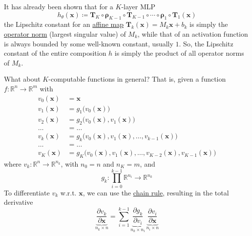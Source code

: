   \begin{theorem}
    \label{thm:lipschitz-upper-bound-for-mlps}
    It has already been shown that for a $K$-layer MLP
    \begin{equation}
      h_\theta (\mathbf{x}) \coloneqq \mathbf{T}_K \circ \boldsymbol{\rho}_{K-1} \circ \mathbf{T}_{K-1} \circ \cdots \circ \boldsymbol{\rho}_1 \circ \mathbf{T}_1 (\mathbf{x})
    \end{equation}
    the Lipschitz constant for an \hyperref[alg-def:affine-map]{affine map} $\mathbf{T}_k (\mathbf{x}) = M_k \mathbf{x} + b_k$ is simply the \hyperref[lin-def:operator-norm-2]{operator norm} (largest singular value) of $M_k$, while that of an activation function is always bounded by some well-known constant, usually $1$. So, the Lipschitz constant of the entire composition $h$ is simply the product of all operator norms of $M_k$. 
  \end{theorem}

  What about $K$-computable functions in general? That is, given a function $f: \mathbb{R}^n \to \mathbb{R}^m$ with 
  \begin{align}
    v_0 (\mathbf{x}) & = \mathbf{x} \\ 
    v_1 (\mathbf{x}) & = g_1 \big(v_0(\mathbf{x}) \big) \\
    v_2 (\mathbf{x}) & = g_2 \big(v_0(\mathbf{x}), v_1 (\mathbf{x}) \big) \\ 
    \ldots & = \ldots \\
    v_k (\mathbf{x}) & = g_k \big(v_0 (\mathbf{x}), v_1(\mathbf{x}), \ldots, v_{k-1} (\mathbf{x}) \big) \\
    \ldots & = \ldots \\
    v_K (\mathbf{x}) & = g_K \big(v_0(\mathbf{x}), v_1 (\mathbf{x}), \ldots, v_{K-2}(\mathbf{x}), v_{K-1}(\mathbf{x}) \big)
  \end{align}
  where $v_k: \mathbb{R}^n \to \mathbb{R}^{n_k}$, with $n_0 = n$ and $n_K = m$, and 
  \begin{equation}
    g_k : \prod_{i=0}^{k-1} \mathbb{R}^{n_i} \to \mathbb{R}^{n_k}
  \end{equation}
  To differentiate $v_k$ w.r.t. $\mathbf{x}$, we can use the \hyperref[mv-thm:chain-rule]{chain rule}, resulting in the total derivative 
  \begin{equation}
    \underbrace{\frac{\partial v_k}{\partial \mathbf{x}}}_{n_k \times n} = \sum_{i=1}^{k-1} \underbrace{\frac{\partial g_k}{\partial v_i}}_{n_k \times n_i} \, \underbrace{\frac{\partial v_i}{\partial \mathbf{x}}}_{n_i \times n}
  \end{equation}

